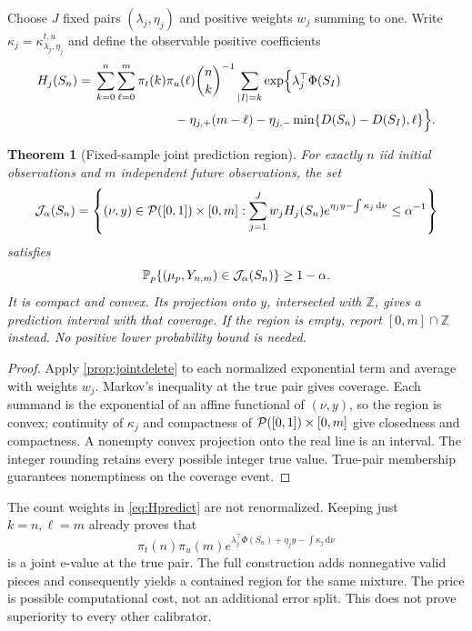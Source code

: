 \documentclass[11pt]{article}
\numberwithin{equation}{section}
\newtheorem{theorem}{Theorem}[section]
\theoremstyle{definition}
\theoremstyle{remark}
\newcommand{\dd}{\,\mathrm d}\newcommand{\norm}[1]{\left\lVert#1\right\rVert}\newcommand{\Scal}{\mathsf S}\newcommand{\Tcal}{\mathsf T}
\begin{document}
Choose $J$ fixed pairs $(\lambda_j,\eta_j)$ and positive weights $w_j$ summing to one. Write $\kappa_j=\kappa_{\lambda_j,\eta_j}^{t,u}$ and define the observable positive coefficients
\begin{equation}\label{eq:Hpredict}
\begin{split}
 H_j(S_n)={}&\sum_{k=0}^n\sum_{\ell=0}^m\pi_t(k)\pi_u(\ell)\binom nk^{-1}
 \sum_{|I|=k}\exp\Bigl\{\lambda_j^\top\Phi(S_I)\\
 &\hspace{22mm}-\eta_{j,+}(m-\ell)
 -\eta_{j,-}\min\{D(S_n)-D(S_I),\ell\}\Bigr\}.
\end{split}
\end{equation}

\begin{theorem}[Fixed-sample joint prediction region]\label{thm:fixedprediction}
For exactly $n$ iid initial observations and $m$ independent future observations, the set
\begin{equation}\label{eq:fixedjointregion}
 \mathcal J_\alpha(S_n)=
 \left\{(\nu,y)\in\Prob([0,1])\times[0,m]:
 \sum_{j=1}^Jw_jH_j(S_n)
       e^{\eta_jy-\int\kappa_j\dd\nu}\le\alpha^{-1}\right\}
\end{equation}
satisfies
\[
 \mathbb P_p\{(\mu_p,Y_{n,m})\in\mathcal J_\alpha(S_n)\}\ge1-\alpha.
\]
It is compact and convex. Its projection onto $y$, intersected with $\mathbb Z$, gives a prediction interval with that coverage. If the region is empty, report $[0,m]\cap\mathbb Z$ instead. No positive lower probability bound is needed.
\end{theorem}
\begin{proof}
Apply \cref{prop:jointdelete} to each normalized exponential term and average with weights $w_j$. Markov's inequality at the true pair gives coverage. Each summand is the exponential of an affine functional of $(\nu,y)$, so the region is convex; continuity of $\kappa_j$ and compactness of $\mathcal P([0,1])\times[0,m]$ give closedness and compactness. A nonempty convex projection onto the real line is an interval. The integer rounding retains every possible integer true value. True-pair membership guarantees nonemptiness on the coverage event.
\end{proof}
The count weights in \eqref{eq:Hpredict} are not renormalized. Keeping just $k=n,\ell=m$ already proves that
\[
 \pi_t(n)\pi_u(m)
 e^{\lambda_j^\top\Phi(S_n)+\eta_j y-\int\kappa_j\dd\nu}
\]
is a joint e-value at the true pair. The full construction adds nonnegative valid pieces and consequently yields a contained region for the same mixture. The price is possible computational cost, not an additional error split. This does not prove superiority to every other calibrator.
\end{document}
